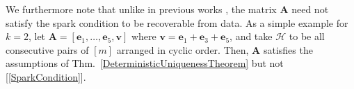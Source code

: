 \documentclass[9pt,twocolumn]{pnas-new}
\renewcommand{\eqref}[1]{\textnormal{[\ref{#1}]}}
\begin{document}




We furthermore note that unlike in previous works \cite{li2004analysis, Georgiev05, Aharon06, Hillar15}, the matrix $\mathbf{A}$ need not satisfy the spark condition to be recoverable from data. As a simple example for $k=2$, let $\mathbf{A} = [ \mathbf{e}_1, \ldots, \mathbf{e}_5, \mathbf{v}]$ where $\mathbf{v} = \mathbf{e}_1 + \mathbf{e}_3 + \mathbf{e}_5$, and take $\mathcal{H}$ to be all consecutive pairs of $[m]$ arranged in cyclic order. Then, $\mathbf{A}$ satisfies the assumptions of Thm.~\ref{DeterministicUniquenessTheorem} but not \eqref{SparkCondition}. %
\end{document}
